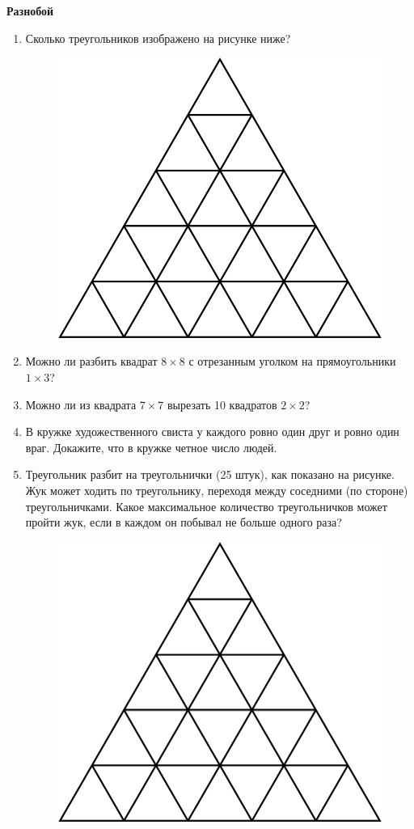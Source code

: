 \documentclass{article}
\begin{document}
\large
	
\begin{center}
	\textbf{Разнобой}
\end{center}


\begin{enumerate}[label*=\protect\fbox{\arabic{enumi}}]

\item Сколько треугольников изображено на рисунке ниже?

\begin{figure}[h]
	\centering
	\includegraphics[width=0.3\linewidth]{img.png}
\end{figure}

\item Можно ли разбить квадрат $8\times 8$ с отрезанным уголком на прямоугольники $1\times 3$?

\item Можно ли из квадрата $7\times 7$ вырезать 10 квадратов $2\times2$?

\item В кружке художественного свиста у каждого ровно один друг и ровно один враг. Докажите, что в кружке четное число людей.

\item Треугольник разбит на треугольнички (25 штук), как показано на рисунке. Жук может ходить по треугольнику, переходя между соседними (по стороне) треугольничками. Какое максимальное количество треугольничков может пройти жук, если в каждом он побывал не больше одного раза?

\begin{figure}[h]
	\centering
	\includegraphics[width=0.3\linewidth]{img.png}
\end{figure}


\end{enumerate}
\end{document}
